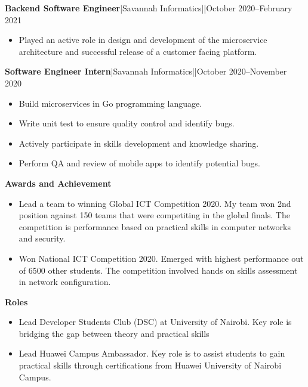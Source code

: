 \documentclass[a4paper]{article}
\begin{document}
\textbf{Backend Software Engineer}|Savannah Informatics||October 2020--February 2021

\begin{itemize}[noitemsep]
    \item Played an active role in design and development of the microservice architecture and successful release of a customer facing platform.
\end{itemize}

\textbf{Software Engineer Intern}|Savannah Informatics||October 2020--November 2020

\begin{itemize}[noitemsep]
    \item Build microservices in Go programming language.
    \item Write unit test to ensure quality control and identify bugs.
    \item Actively participate in skills development and knowledge sharing.
    \item Perform QA and review of mobile apps to identify potential bugs.
\end{itemize}

\begin{center}
    {\Large \textbf{Awards and Achievement}}
\end{center}

\begin{itemize}[noitemsep]
    \item Lead a team to winning Global ICT Competition 2020. My team won 2nd position against 150 teams that were competiting in the global finals. The competition is performance based on practical skills in computer networks and security.
    \item Won National ICT Competition 2020. Emerged with highest performance out of 6500 other students. The competition involved hands on skills assessment in network configuration.
\end{itemize}

\begin{center}
    {\Large \textbf{Roles}}
\end{center}

\begin{itemize}[noitemsep]
    \item Lead Developer Students Club (DSC) at University of Nairobi. Key role is bridging the gap between theory and practical skills
    \item Lead Huawei Campus Ambassador. Key role is to assist students to gain practical skills through certifications from Huawei University of Nairobi Campus.
\end{itemize}
\end{document}
